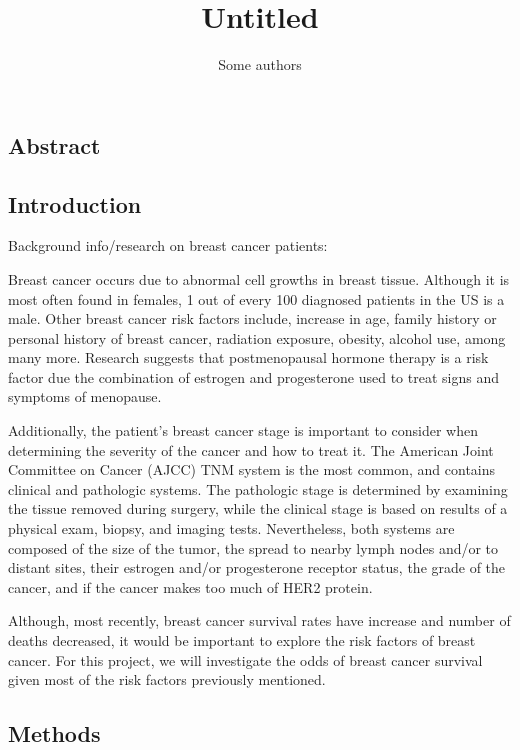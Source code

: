 \documentclass[]{article}
\title{Untitled}
\author{Some authors}
\date{}
\begin{document}
\maketitle

\hypertarget{abstract}{%
\subsection{Abstract}\label{abstract}}

\hypertarget{introduction}{%
\subsection{Introduction}\label{introduction}}

Background info/research on breast cancer patients:

Breast cancer occurs due to abnormal cell growths in breast tissue.
Although it is most often found in females, 1 out of every 100 diagnosed
patients in the US is a male. Other breast cancer risk factors include,
increase in age, family history or personal history of breast cancer,
radiation exposure, obesity, alcohol use, among many more. Research
suggests that postmenopausal hormone therapy is a risk factor due the
combination of estrogen and progesterone used to treat signs and
symptoms of menopause.

Additionally, the patient's breast cancer stage is important to consider
when determining the severity of the cancer and how to treat it. The
American Joint Committee on Cancer (AJCC) TNM system is the most common,
and contains clinical and pathologic systems. The pathologic stage is
determined by examining the tissue removed during surgery, while the
clinical stage is based on results of a physical exam, biopsy, and
imaging tests. Nevertheless, both systems are composed of the size of
the tumor, the spread to nearby lymph nodes and/or to distant sites,
their estrogen and/or progesterone receptor status, the grade of the
cancer, and if the cancer makes too much of HER2 protein.

Although, most recently, breast cancer survival rates have increase and
number of deaths decreased, it would be important to explore the risk
factors of breast cancer. For this project, we will investigate the odds
of breast cancer survival given most of the risk factors previously
mentioned.

\hypertarget{methods}{%
\subsection{Methods}\label{methods}}
\end{document}
